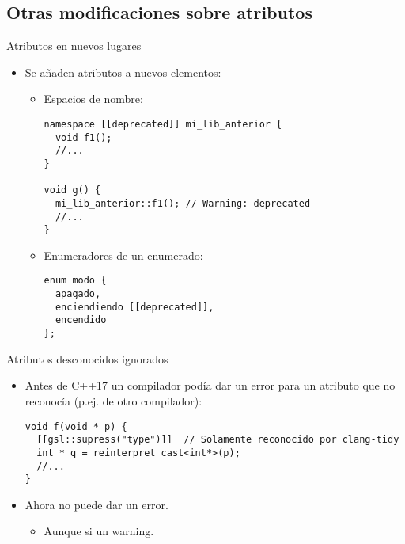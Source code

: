 \subsection{Otras modificaciones sobre atributos}

\begin{frame}[t,fragile]{Atributos en nuevos lugares}
\begin{itemize}
  \item Se añaden atributos a nuevos elementos:
    \begin{itemize}
      \item Espacios de nombre:
\begin{lstlisting}
namespace [[deprecated]] mi_lib_anterior {
  void f1();
  //...
}

void g() {
  mi_lib_anterior::f1(); // Warning: deprecated
  //...
}
\end{lstlisting}

      \item Enumeradores de un enumerado:
\begin{lstlisting}
enum modo {
  apagado,
  enciendiendo [[deprecated]],
  encendido
};	
\end{lstlisting}
    \end{itemize}
\end{itemize}
\end{frame}

\begin{frame}[t,fragile]{Atributos desconocidos ignorados}
\begin{itemize}
  \item Antes de C++17 un compilador podía dar un error para un atributo
        que no reconocía (p.ej. de otro compilador):
\begin{lstlisting}
void f(void * p) {
  [[gsl::supress("type")]]  // Solamente reconocido por clang-tidy
  int * q = reinterpret_cast<int*>(p);
  //...
}
\end{lstlisting}
  \vfill
  \item Ahora no puede dar un error.
    \begin{itemize}
      \item Aunque si un warning.
    \end{itemize}
\end{itemize}
\end{frame}

